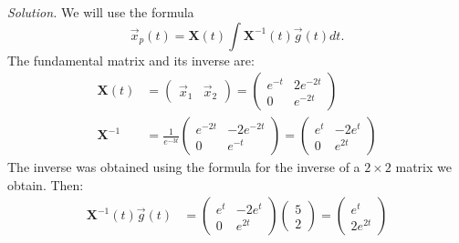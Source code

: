     
    \ifnum {} {\color{DarkBlue} \textit{Solution.} 
    We will use the formula
$$\vec x_p(t) = \mathbf{X}(t) \int \mathbf{X} ^ {-1} (t) \vec{g} (t) dt.$$
The fundamental matrix and its inverse are:
\begin{align}
    \mathbf{X} (t) &= \begin{pmatrix} \vec{x}_{1} & \vec{x}_{2}\end{pmatrix} = \begin{pmatrix} 
    e ^ {-t} & 2e ^ {-2t}\\ 0 &   e ^ {-2t} \end{pmatrix} \\
    \mathbf{X}^{-1} &= \frac{1}{e^{-3t}}\begin{pmatrix} e^{-2t} & -2e^{-2t} \\0 & e^{-t}\end{pmatrix} = \begin{pmatrix} e^t & -2e^t \\0 & e^{2t} \end{pmatrix}
\end{align}
The inverse was obtained using the formula for the inverse of a $2\times 2$ matrix we obtain. Then:
\begin{align}
    \mathbf{X} ^ {-1} (t) \vec{g}(t) &= \begin{pmatrix} e^t & -2e^t \\0 & e^{2t} \end{pmatrix} \begin{pmatrix} 5\\2 \end{pmatrix} = \begin{pmatrix} e^t \\ 2e^{2t}\end{pmatrix} \\

\end{align}}

